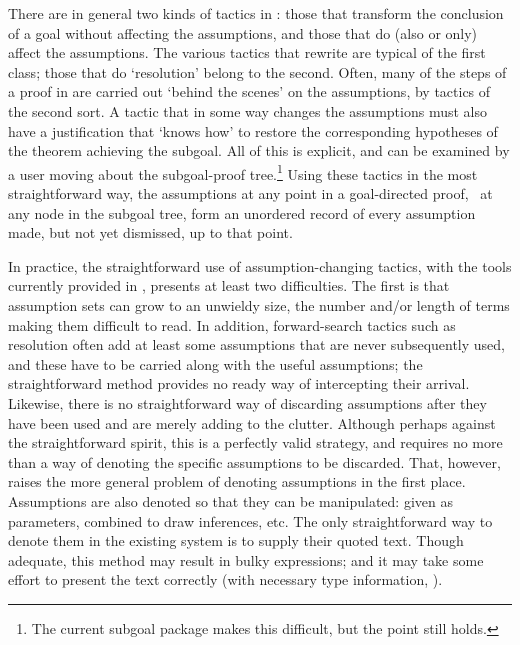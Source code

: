 There are in general two kinds of tactics
 in \HOL: those that transform the
conclusion of a goal without affecting the assumptions, and those that
do (also or only) affect the assumptions.  The various tactics that
rewrite
 are typical of the first class; those that do `resolution'
 belong to
the second.  Often, many of the steps of a proof in \HOL{} are carried
out `behind the scenes' on the assumptions, by tactics of the second sort.
A tactic that in some way changes the assumptions must also have a
justification that `knows how' to restore the corresponding hypotheses of
the theorem achieving the subgoal. All of this is explicit, and can be
examined by a user moving about the subgoal-proof tree.\footnote{The current
subgoal package makes this difficult, but the point still holds.}
Using these tactics in the most straightforward way, the assumptions at any
point in a goal-directed proof, \ie\ at any node in the subgoal tree,
 form
an unordered record of every assumption made, but not yet dismissed, up to that
point.

In practice, the straightforward use of assumption-changing
tactics,
with the tools currently provided in \HOL, presents at
least two difficulties.  The first is that assumption sets can grow to an
unwieldy size, the number and/or length of terms making them difficult to
read.  In addition, forward-search tactics such as resolution often add at least
some assumptions that are never subsequently used, and these have to be
carried along with the useful assumptions; the straightforward
method provides no ready way of intercepting their arrival.
Likewise, there is no straightforward way of discarding
assumptions after they have been used and are merely adding to the clutter.
Although perhaps against the straightforward spirit, this is a perfectly valid
strategy, and
requires no more than a way of denoting
the specific assumptions to be discarded. That, however,
raises the more general problem of denoting assumptions in the first place.
Assumptions are also denoted
so that they can be
manipulated: given as parameters, combined to draw inferences, etc.  The only
straightforward way to denote them in the existing system is to supply
their quoted text.  Though adequate, this
method may result in bulky \ML{} expressions; and it may take some effort to present the text
correctly (with necessary type information, \etc).

